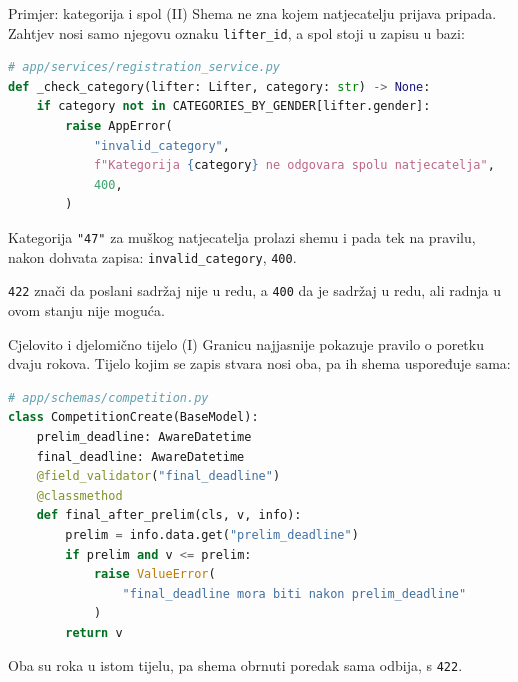 \begin{frame}[fragile]{Primjer: kategorija i spol (II)}
Shema ne zna kojem natjecatelju prijava pripada. Zahtjev nosi samo njegovu oznaku \texttt{lifter\_id}, a spol stoji u zapisu u bazi:

\begin{lstlisting}[language=python]
# app/services/registration_service.py
def _check_category(lifter: Lifter, category: str) -> None:
    if category not in CATEGORIES_BY_GENDER[lifter.gender]:
        raise AppError(
            "invalid_category",
            f"Kategorija {category} ne odgovara spolu natjecatelja",
            400,
        )
\end{lstlisting}

\vspace{0.3em}
Kategorija \texttt{"47"} za muškog natjecatelja prolazi shemu i pada tek na pravilu, nakon dohvata zapisa: \texttt{invalid\_category}, \texttt{400}.

\vspace{0.1em}
\texttt{422} znači da poslani sadržaj nije u redu, a \texttt{400} da je sadržaj u redu, ali radnja u ovom stanju nije moguća.
\end{frame}

\begin{frame}[fragile]{Cjelovito i djelomično tijelo (I)}
Granicu najjasnije pokazuje pravilo o poretku dvaju rokova. Tijelo kojim se zapis stvara nosi oba, pa ih shema uspoređuje sama:

\begin{lstlisting}[language=python]
# app/schemas/competition.py
class CompetitionCreate(BaseModel):
    prelim_deadline: AwareDatetime
    final_deadline: AwareDatetime
    @field_validator("final_deadline")
    @classmethod
    def final_after_prelim(cls, v, info):
        prelim = info.data.get("prelim_deadline")
        if prelim and v <= prelim:
            raise ValueError(
                "final_deadline mora biti nakon prelim_deadline"
            )
        return v
\end{lstlisting}

\vspace{0.3em}
Oba su roka u istom tijelu, pa shema obrnuti poredak sama odbija, s \texttt{422}.
\end{frame}


